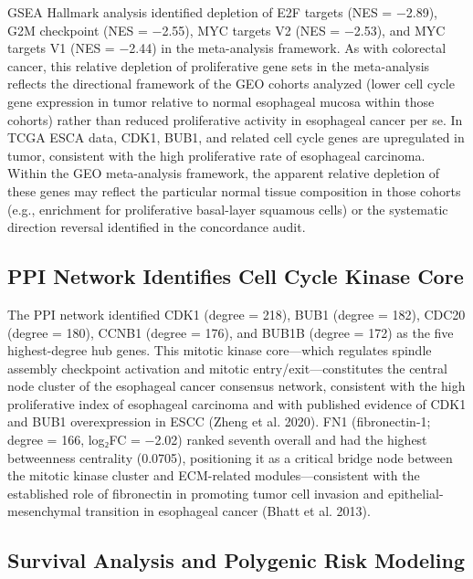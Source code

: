 \documentclass[
  12pt,
]{article}
\begin{document}
GSEA Hallmark analysis identified depletion of E2F targets (NES =
−2.89), G2M checkpoint (NES = −2.55), MYC targets V2 (NES = −2.53), and
MYC targets V1 (NES = −2.44) in the meta-analysis framework. As with
colorectal cancer, this relative depletion of proliferative gene sets in
the meta-analysis reflects the directional framework of the GEO cohorts
analyzed (lower cell cycle gene expression in tumor relative to normal
esophageal mucosa within those cohorts) rather than reduced
proliferative activity in esophageal cancer per se. In TCGA ESCA data,
CDK1, BUB1, and related cell cycle genes are upregulated in tumor,
consistent with the high proliferative rate of esophageal carcinoma.
Within the GEO meta-analysis framework, the apparent relative depletion
of these genes may reflect the particular normal tissue composition in
those cohorts (e.g., enrichment for proliferative basal-layer squamous
cells) or the systematic direction reversal identified in the
concordance audit.

\subsection{PPI Network Identifies Cell Cycle Kinase
Core}\label{ppi-network-identifies-cell-cycle-kinase-core}

The PPI network identified CDK1 (degree = 218), BUB1 (degree = 182),
CDC20 (degree = 180), CCNB1 (degree = 176), and BUB1B (degree = 172) as
the five highest-degree hub genes. This mitotic kinase core---which
regulates spindle assembly checkpoint activation and mitotic
entry/exit---constitutes the central node cluster of the esophageal
cancer consensus network, consistent with the high proliferative index
of esophageal carcinoma and with published evidence of CDK1 and BUB1
overexpression in ESCC (Zheng et al. 2020). FN1 (fibronectin-1; degree =
166, log₂FC = −2.02) ranked seventh overall and had the highest
betweenness centrality (0.0705), positioning it as a critical bridge
node between the mitotic kinase cluster and ECM-related
modules---consistent with the established role of fibronectin in
promoting tumor cell invasion and epithelial-mesenchymal transition in
esophageal cancer (Bhatt et al. 2013).

\subsection{Survival Analysis and Polygenic Risk
Modeling}\label{survival-analysis-and-polygenic-risk-modeling}
\end{document}
